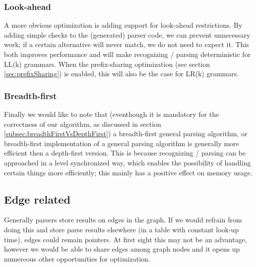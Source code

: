 \documentclass[a4paper,10pt]{article}
\begin{document}
\subsubsection{Look-ahead}
A more obvious optimization is adding support for look-ahead restrictions. By adding simple checks to the (generated) parser code, we can prevent unnecessary work; if a certain alternative will never match, we do not need to expect it. This both improves performance and will make recognizing / parsing deterministic for LL(k) grammars. When the prefix-sharing optimization (see section \ref{sec:prefixSharing}) is enabled, this will also be the case for LR(k) grammars.

\subsubsection{Breadth-first}
Finally we would like to note that (eventhough it is mandatory for the correctness of our algorithm, as discussed in section \ref{subsec:breadthFirstVsDepthFirst}) a breadth-first general parsing algorithm, or breadth-first implementation of a general parsing algorithm is generally more efficient then a depth-first version. This is because recognizing / parsing can be approached in a level synchronized way, which enables the possibility of handling certain things more efficiently; this mainly has a positive effect on memory usage.

\subsection{Edge related}
\label{sec:edgeOptimizations}

Generally parsers store results on edges in the graph. If we would refrain from doing this and store parse results elsewhere (in a table with constant look-up time), edges could remain pointers. At first sight this may not be an advantage, however we would be able to share edges among graph nodes and it opens up numereous other opportunities for optimization.
\end{document}
